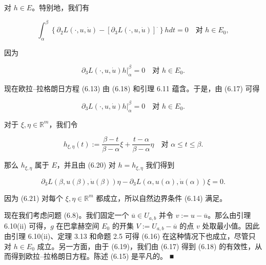 \begin{theorem}
\begin{subitems}
对 $ h \in E $。特别地，我们有

\begin{equation}
\int_{\alpha}^{\beta}\left\{\partial_{2}L(\cdot, u, \dot{u}) - \left[\partial_{3}L(\cdot, u, \dot{u})\right]^{\cdot}\right\}h dt = 0 \quad \text{对 } h \in E_{0} ,\tag{6.18}
\end{equation}

因为

\begin{equation}
\partial_{3}L(\cdot, u, \dot{u})h\big|_{\alpha}^{\beta} = 0 \quad \text{对 } h \in E_{0} .\tag{6.19}
\end{equation}

现在欧拉–拉格朗日方程 (6.13) 由 (6.18) 和引理 6.11 蕴含。于是，由 (6.17) 可得

\begin{equation}
\partial_{3}L(\cdot, u, \dot{u})h\big|_{\alpha}^{\beta} = 0 \quad \text{对 } h \in E_{0} .\tag{6.20}
\end{equation}

对于 $ \xi, \eta \in \mathbb{R}^{m} $，我们令

\[
h_{\xi,\eta}(t) := \frac{\beta - t}{\beta - \alpha}\xi + \frac{t - \alpha}{\beta - \alpha}\eta \quad \text{对 } \alpha \le t \le \beta .
\]

那么 $ h_{\xi,\eta} $ 属于 $ E $，并且由 (6.20) 对 $ h = h_{\xi,\eta} $ 我们得到

\begin{equation}
\partial_{3}L(\beta, u(\beta), \dot{u}(\beta))\eta - \partial_{3}L(\alpha, u(\alpha), \dot{u}(\alpha))\xi = 0 .\tag{6.21}
\end{equation}

因为 (6.21) 对每个 $ \xi, \eta \in \mathbb{R}^{m} $ 都成立，所以自然边界条件 (6.14) 满足。

\item

现在我们考虑问题 (6.8)。我们固定一个 $ \overline{u} \in U_{a,b} $ 并令 $ v := u - \overline{u} $。那么由引理 6.10(ii) 可得，$ g $ 在巴拿赫空间 $ E_{0} $ 的开集 $ V := U_{a,b} - \overline{u} $ 的点 $ v $ 处取最小值。因此由引理 6.10(ii)、定理 3.13 和命题 2.5 可得 (6.16) 在这种情况下也成立，尽管只对 $ h \in E_{0} $ 成立。另一方面，由于 (6.19)，我们由 (6.17) 得到 (6.18) 的有效性，从而得到欧拉–拉格朗日方程。陈述 (6.15) 是平凡的。 \nobreak\hspace{0.35em}■

\end{subitems}

\end{theorem}

